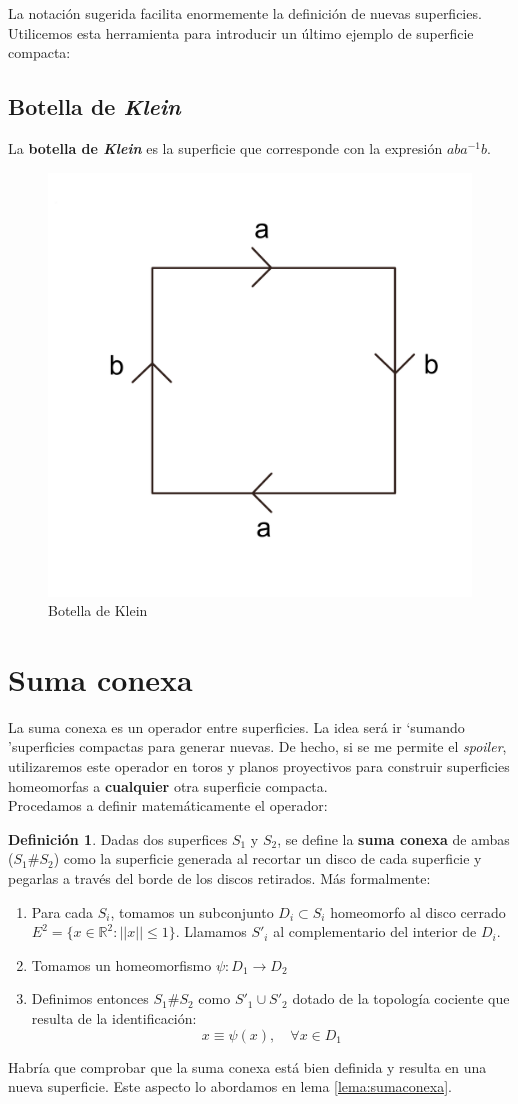 \documentclass[a4paper,11pt,spanish, twoside, leqno]{tfg-uam}
\theoremstyle{definition}
\newtheorem{defin}[teor]{Definici\'on}
\begin{document}
La notación sugerida facilita enormemente la definición de nuevas superficies. Utilicemos esta herramienta para introducir un último ejemplo de superficie compacta:


\subsection*{Botella de \textit{Klein}}
	La \textbf{botella de \textit{Klein}} es la superficie que corresponde con la expresión $ aba^{-1}b $.

\begin{figure}[h!]
	\centering
	\includegraphics[width=0.3\linewidth]{imagenes/klein.png}
	\caption{Botella de Klein}
	\label{fig:botelladeklein expresion canónica}
\end{figure} 




\section{Suma conexa}

La suma conexa es un operador entre superficies. La idea será ir \textquoteleft sumando \textquoteright superficies compactas para generar nuevas. De hecho, si se me permite el \textit{spoiler}, utilizaremos este operador en toros y planos proyectivos para construir superficies homeomorfas a \textbf{cualquier} otra superficie compacta.\\
Procedamos a definir matemáticamente el operador:

\begin{defin}\label{defin:sumaconexa}
	Dadas dos superfices $S_1$ y $S_2$, se define la \textbf{suma conexa} de ambas ($S_1\#S_2$) como la superficie generada al recortar un disco de cada superficie y pegarlas a través del borde de los discos retirados. Más formalmente:
	\begin{enumerate}
		\item 
		Para cada $S_i$, tomamos un subconjunto $D_i\subset S_i$ homeomorfo al disco cerrado $E^2=\{x\in\mathbb{R}^2: ||x||\leq 1\}$. Llamamos $S'_i$ al complementario del interior de $D_i$.
		\item 
		Tomamos un homeomorfismo $\psi:D_1\longrightarrow D_2$
		\item 
		Definimos entonces $S_1\#S_2$ como $S'_1\cup S'_2$ dotado de la topología cociente que resulta de la identificación:
		\[
		x \equiv  \psi(x), \quad \forall x \in D_1
		\] 
	\end{enumerate}
	Habría que comprobar que la suma conexa está bien definida y resulta en una nueva superficie. Este aspecto lo abordamos en lema \ref{lema:sumaconexa}.
\end{defin}
\end{document}
